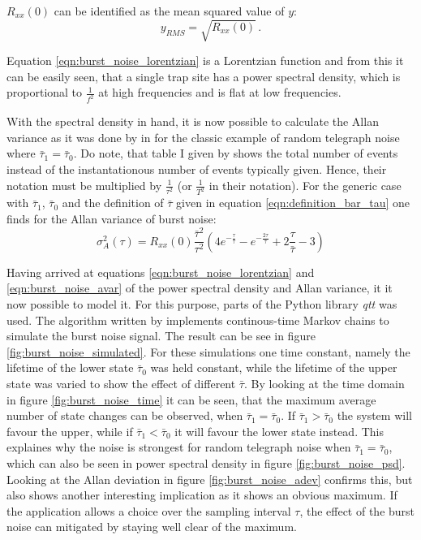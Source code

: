 $R_{xx} (0)$ can be identified as the mean squared value of $y$:
\begin{equation}
    y_{RMS} = \sqrt{R_{xx}(0)} \,.
\end{equation}

Equation \ref{eqn:burst_noise_lorentzian} is a Lorentzian function and from this it can be easily seen, that a single trap site has a power spectral density, which is proportional to $\frac{1}{f^2}$ at high frequencies and is flat at low frequencies.

With the spectral density in hand, it is now possible to calculate the Allan variance as it was done by \citeauthor{allen_dev_flicker} in \cite{allen_dev_flicker} for the classic example of random telegraph noise where $\bar \tau_1 = \bar \tau_0$. Do note, that table I given by \citeauthor{allen_dev_flicker} shows the total number of events instead of the instantationous number of events typically given. Hence, their notation must be multiplied by $\frac{1}{\tau^2}$ (or $\frac{1}{T^2}$ in their notation). For the generic case with $\bar \tau_1$, $\bar \tau_0$ and the definition of $\bar \tau$ given in equation \ref{eqn:definition_bar_tau} one finds for the Allan variance of burst noise:
\begin{equation}
    \sigma^2_A(\tau) = R_{xx}(0) \frac{\bar \tau^2}{\tau^2} \left(4 e^{-\frac{\tau}{\bar \tau}} - e^{-\frac{2 \tau}{\bar \tau}} + 2 \frac{\tau}{\bar \tau} - 3 \right) \label{eqn:burst_noise_avar}
\end{equation}

Having arrived at equations \ref{eqn:burst_noise_lorentzian} and \ref{eqn:burst_noise_avar} of the power spectral density and Allan variance, it it now possible to model it. For this purpose, parts of the Python library \textit{qtt} \cite{qtt} was used. The algorithm written by \citeauthor{qtt} implements continous-time Markov chains to simulate the burst noise signal. The result can be see in figure \ref{fig:burst_noise_simulated}. For these simulations one time constant, namely the lifetime of the lower state $\bar \tau_0$ was held constant, while the lifetime of the upper state was varied to show the effect of different $\bar \tau$. By looking at the time domain in figure \ref{fig:burst_noise_time} it can be seen, that the maximum average number of state changes can be observed, when $\bar \tau_1 = \bar \tau_0$. If $\bar \tau_1 > \bar \tau_0$ the system will favour the upper, while if $\bar \tau_1 < \bar \tau_0$ it will favour the lower state instead. This explaines why the noise is strongest for random telegraph noise when $\bar \tau_1 = \bar \tau_0$, which can also be seen in power spectral density in figure \ref{fig:burst_noise_psd}. Looking at the Allan deviation in figure \ref{fig:burst_noise_adev} confirms this, but also shows another interesting implication as it shows an obvious maximum. If the application allows a choice over the sampling interval $\tau$, the effect of the burst noise can mitigated by staying well clear of the maximum.

